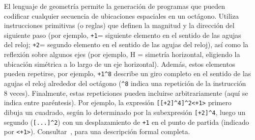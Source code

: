 El lenguaje de geometría permite la generación de programas que pueden codificar cualquier secuencia de ubicaciones espaciales en un octágono. Utiliza instrucciones primitivas (o reglas) que definen la magnitud y la dirección del siguiente paso (por ejemplo, \verb#+1#= siguiente elemento en el sentido de las agujas del reloj; \verb#+2#= segundo elemento en el sentido de las agujas del reloj), así como la reflexión sobre algunos ejes (por ejemplo, H = simetría horizontal, eligiendo la ubicación simétrica a lo largo de un eje horizontal). Además, estos elementos pueden repetirse, por ejemplo, \verb#+1^8# describe un giro completo en el sentido de las agujas el reloj alrededor del octágono (\verb#^8# indica una repetición de la instrucción 8 veces). Finalmente, estas repeticiones pueden incluirse arbitrariamente (aquí se indica entre paréntesis). Por ejemplo, la expresión \verb#[[+2]^4]^2<+1># primero dibuja un cuadrado, según lo determinado por la subexpresión \verb#[+2]^4#, luego un segundo (\verb#[...]^2#) con un desplazamiento de \verb#+1# en el punto de partida (indicado por \verb#<+1>#). Consultar~\cite{amalric2017language}, para una descripción formal completa. 



